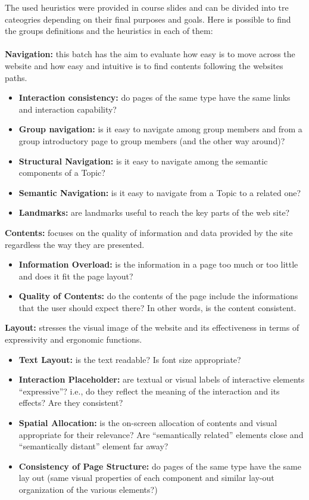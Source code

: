 The used heuristics were provided in course slides and can be divided into tre cateogries depending on their final purposes and goals. Here is possible to find the groups definitions and the heuristics in each of them: \\ 
\\
\textbf{Navigation:} this batch has the aim to evaluate how easy is to move across the website and how easy and intuitive is to find contents following the websites paths.
	\begin{itemize}
		\item \textbf{Interaction consistency:} do pages of the same type have the same links and interaction capability?
		\item \textbf{Group navigation:} is it easy to navigate among group members and from a group introductory page to 				group members (and the other way around)?
		\item \textbf{Structural Navigation:} is it easy to navigate among the semantic components of a Topic?
		\item \textbf{Semantic Navigation:} is it easy to navigate from a Topic to a related one?
		\item \textbf{Landmarks:} are landmarks useful to reach the key parts of the web site?
	\end{itemize}
\textbf{Contents:} focuses on the quality of information and data provided by the site regardless the way they are presented. 
	\begin{itemize}
		\item \textbf{Information Overload:} is the information in a page too much or too little and does it fit the page layout?
		\item \textbf{Quality of Contents:} do the contents of the page include the informations that the user should expect 				there? In other words, is the content consistent.
	\end{itemize}
\textbf{Layout:} stresses the visual image of the website and its effectiveness in terms of expressivity and ergonomic functions. 
	\begin{itemize}
		\item \textbf{Text Layout:} is the text readable? Is font size appropriate?
		\item \textbf{Interaction Placeholder:} are textual or visual labels of interactive elements “expressive”? i.e., do they reflect 			the meaning of the interaction and its effects? Are they consistent?
		\item \textbf{Spatial Allocation:} is the on-screen allocation of contents and visual appropriate for their relevance? Are 				“semantically related” elements close and “semantically distant” element far away?
		\item \textbf{Consistency of Page Structure:} do pages of the same type have the same lay out (same visual properties of 			each component and similar lay-out organization of the various elements?) 
	\end{itemize}
